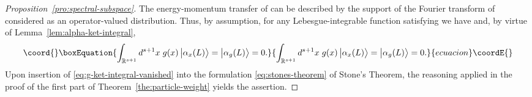 \documentclass[a4paper,a4paper]{article}
\numberwithin{equation}{section}
\providecommand{\Afrak}{\mathfrak{A}}
\providecommand{\Rsone}{\mathbb{R}^{s + 1}}
\providecommand{\ax}{\alpha_x}
\theoremstyle{definition}
\theoremstyle{plain}
\theoremstyle{remark}
\DeclareMathOperator{\supp}{supp}
\providecommand{\bket}[1]{\big\vert #1 \bigr\rangle}
\begin{document}
  \begin{proof}[Proposition~\ref{pro:spectral-subspace}]
    The energy-momentum transfer of \myHighlight{$A \in \Afrak$}\coordHE{} can be described by
    the support of the Fourier transform of \myHighlight{$x \mapsto \ax ( A )$}\coordHE{}
    considered as an operator-valued distribution. Thus, by
    assumption, for any Lebesgue-integrable function \coordHE{} satisfying
    \myHighlight{$\supp \tilde{g} \cap \Delta' = \emptyset$}\coordHE{} we have \coordHE{} and, by virtue of Lemma~\ref{lem:alpha-ket-integral},
    \begin{equation}\coord{}\boxEquation{
      \label{eq:g-ket-integral-vanished}
      \int_{\Rsone} d^{s + 1} x \; g ( x ) \, \bket{\ax ( L )} =
      \bket{\alpha_g ( L )} = 0 \text{.}
    }{
      \int_{\Rsone} d^{s + 1} x \; g ( x ) \, \bket{\ax ( L )} =
      \bket{\alpha_g ( L )} = 0 \text{.}
    }{ecuacion}\coordE{}\end{equation}
    Upon insertion of \eqref{eq:g-ket-integral-vanished} into the
    formulation \eqref{eq:stones-theorem} of Stone's Theorem, the
    reasoning applied in the proof of the first part of
    Theorem~\ref{the:particle-weight} yields the assertion.
  \end{proof}
\end{document}
